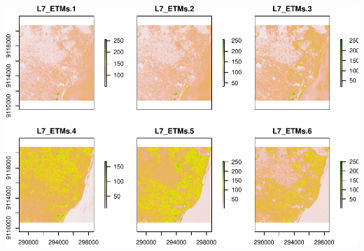 \documentclass[]{article}
\begin{document}
\includegraphics{R_tidyverse_for_geographers_files/figure-latex/unnamed-chunk-34-1.pdf}
\end{document}
